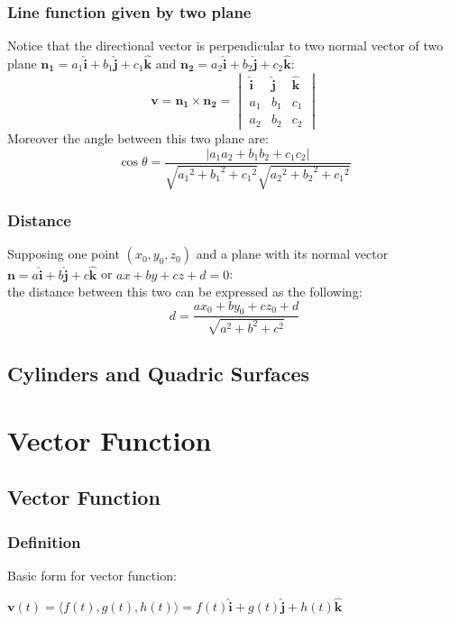 \documentclass[UTF8,a4paper, 10pt, openany]{svmono}
\begin{document}
\subsection{Line function given by two plane}
Notice that the directional vector is perpendicular to two normal vector of two plane $\mathbf{n_1}=a_1\mathbf{\hat{i}}+b_1\mathbf{\hat{j}}+c_1\mathbf{\hat{k}}$ and $\mathbf{n_2}=a_2\mathbf{\hat{i}}+b_2\mathbf{\hat{j}}+c_2\mathbf{\hat{k}}$:
\begin{equation}
\boxed{\mathbf{v}=\mathbf{n_1}\times \mathbf{n_2}=
\begin{vmatrix}
\mathbf{\hat{i}} & \mathbf{\hat{j}} & \mathbf{\hat{k}}\\
a_1 & b_1 & c_1 \\
a_2 & b_2 & c_2
\end{vmatrix}
}
\end{equation}
Moreover the angle between this two plane are:
\begin{equation}
\boxed{\cos \theta =\frac{|a_1a_2+b_1b_2+c_1c_2|}{\sqrt{{a_1}^2+{b_1}^2+{c_1}^2}\sqrt{{a_2}^2+{b_2}^2+{c_1}^2}}}
\end{equation}

\subsection{Distance}
Supposing one point $(x_0,y_0,z_0)$ and a plane with its normal vector $\mathbf{n}=a\mathbf{\hat{i}}+b\mathbf{\hat{j}}+c\mathbf{\hat{k}}$ or $ax+by+cz+d=0$:\\
the distance between this two can be expressed as the following:
\begin{equation}
\boxed{d=\frac{ax_0+by_0+cz_0+d}{\sqrt{a^2+b^2+c^2}}}
\end{equation}

\section{Cylinders and Quadric Surfaces}

\chapter{Vector Function}
\section{Vector Function}
\subsection{Definition}
Basic form for vector function:
\begin{center}
$\mathbf{v}(t)=\langle f(t),g(t),h(t)\rangle=f(t)\mathbf{\hat{i}}+g(t)\mathbf{\hat{j}}+h(t)\mathbf{\hat{k}}$
\end{center}
\end{document}
